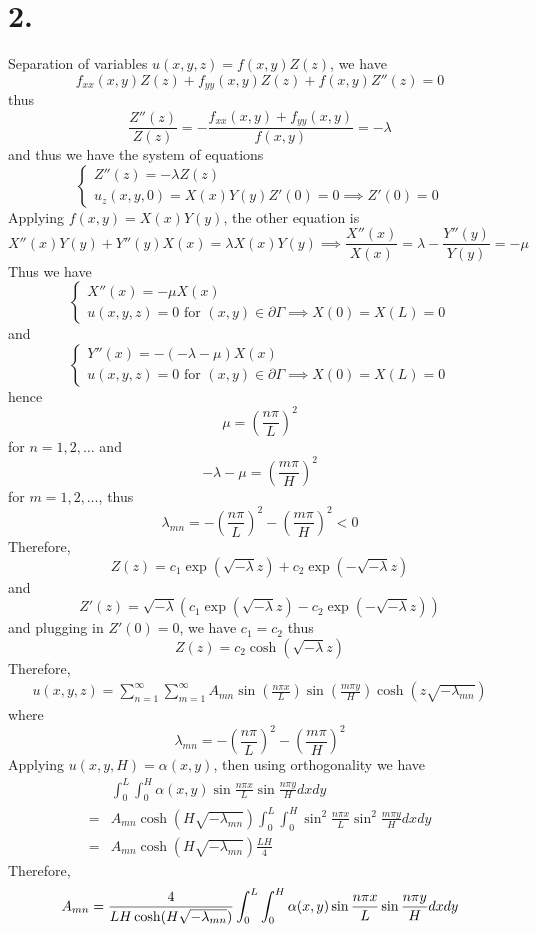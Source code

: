 \documentclass[11pt]{article}
\theoremstyle{mystyle}
\theoremstyle{definition}
\begin{document}
\section*{2.}
Separation of variables $u(x,y,z) = f(x,y) Z(z)$, we have 
\[
  f_{xx}(x,y) Z(z) + f_{yy}(x,y) Z(z) + f(x,y)Z''(z) = 0
\]
thus 
\[
  \displaystyle\frac{Z''(z)}{Z(z)} = - \displaystyle\frac{f_{xx}(x,y) + f_{yy}(x,y)}{f(x,y)} = -\lambda
\]
and thus we have the system of equations 
\[
    \begin{cases}
      Z''(z) = -\lambda Z(z) \\ 
      u_z(x,y,0) = X(x) Y(y) Z'(0) = 0 \implies Z'(0) = 0 
    \end{cases}
\]
Applying $f(x,y) = X(x) Y(y)$, the other equation is
\[
  X''(x) Y(y) + Y''(y) X(x) = \lambda X(x) Y(y) \implies \displaystyle\frac{X''(x)}{X(x)} = \lambda - \displaystyle\frac{Y''(y)}{Y(y)} = -\mu 
\]
Thus we have 
\[
  \begin{cases}
    X''(x) = -\mu X(x) \\ 
    u(x,y,z) = 0 \text{ for } (x,y) \in \partial \Gamma \implies X(0) = X(L) = 0
  \end{cases}
\]
and 
\[
  \begin{cases}
    Y''(x) = -(-\lambda - \mu) X(x) \\ 
    u(x,y,z) = 0 \text{ for } (x,y) \in \partial \Gamma \implies X(0) = X(L) = 0
  \end{cases}
\]
hence 
\[
  \mu = \left( \displaystyle\frac{n\pi}{L}\right)^2
\]
for $n=1,2,\hdots$ and 
\[
  -\lambda - \mu = \left( \displaystyle\frac{m\pi }{H}\right)^2
\]
for $m= 1,2,\hdots$, thus 
\[
  \lambda_{mn} = - \left( \displaystyle\frac{n\pi}{L}\right)^2 - \left( \displaystyle\frac{m\pi}{H}\right)^2  < 0 
\]
Therefore, 
\[
  Z(z) = c_1 \exp (\sqrt{-\lambda}z) + c_2 \exp(-\sqrt{-\lambda}z)
\]
and 
\[
  Z'(z) = \sqrt{-\lambda}(c_1 \exp (\sqrt{-\lambda}z) - c_2 \exp(-\sqrt{-\lambda}z))
\]
and plugging in $Z'(0) = 0$, we have $c_1 = c_2$ thus 
\[
  Z(z) = c_2 \cosh(\sqrt{-\lambda}z)
\]
Therefore, 
\begin{align*}
  u(x,y,z) = \sum_{n=1}^\infty \sum_{m=1}^\infty A_{mn} \sin \left( \displaystyle\frac{n\pi x}{L}\right) \sin \left( \displaystyle\frac{m\pi y}{H}\right) \cosh\left(z \sqrt{-\lambda_{mn}} \right)
\end{align*}
where 
\[
  \lambda_{mn} = -\left(\displaystyle\frac{n\pi}{L}\right)^2 - \left(\displaystyle\frac{m\pi}{H}\right)^2
\]
Applying $u(x,y,H) = \alpha(x,y)$, then using orthogonality we have 
\begin{align*}
  &\int_0^L \int_0^H \alpha(x,y) \sin \displaystyle\frac{n\pi x}{L} \sin \displaystyle\frac{n\pi y}{H} dx dy \\ 
  =& A_{mn} \cosh (H\sqrt{-\lambda_{mn}}) \int_0^L \int_0^H \sin^2 \displaystyle\frac{n\pi x}{L} \sin^2 \displaystyle\frac{m\pi y}{H} dx dy \\
  =& A_{mn} \cosh(H \sqrt{-\lambda_{mn}}) \displaystyle\frac{LH}{4}
\end{align*}
Therefore, 
\[
  A_{mn} = \displaystyle\frac{4}{LH \cosh(H \sqrt{-\lambda_{mn}})} \int_0^L \int_0^H \alpha(x,y) \sin \displaystyle\frac{n\pi x}{L} \sin \displaystyle\frac{n\pi y}{H} dx dy \\ 
\]
\newpage
\end{document}
